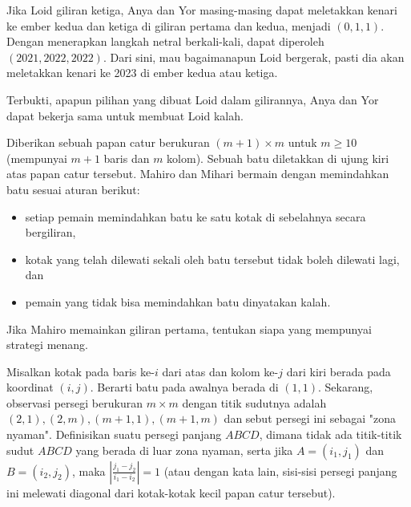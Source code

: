 \documentclass[11pt]{scrartcl}
\begin{document}
\begin{soaljawab}
\begin{solusi}
        Jika Loid giliran ketiga, Anya dan Yor masing-masing dapat meletakkan kenari ke ember kedua dan ketiga di giliran pertama dan kedua, menjadi $(0,1,1)$. Dengan menerapkan langkah netral berkali-kali, dapat diperoleh $(2021,2022,2022)$. Dari sini, mau bagaimanapun Loid bergerak, pasti dia akan meletakkan kenari ke 2023 di ember kedua atau ketiga.

        Terbukti, apapun pilihan yang dibuat Loid dalam gilirannya, Anya dan Yor dapat bekerja sama untuk membuat Loid kalah.
    \end{solusi}
\end{soaljawab}

\begin{soaljawab}
    Diberikan sebuah papan catur berukuran $(m+1) \times m$ untuk $m \ge 10$ (mempunyai $m+1$ baris dan $m$ kolom). Sebuah batu diletakkan di ujung kiri atas papan catur tersebut. Mahiro dan Mihari bermain dengan memindahkan batu sesuai aturan berikut:
    \begin{itemize}
        \item setiap pemain memindahkan batu ke satu kotak di sebelahnya secara bergiliran,
        \item kotak yang telah dilewati sekali oleh batu tersebut tidak boleh dilewati lagi, dan
        \item pemain yang tidak bisa memindahkan batu dinyatakan kalah.
    \end{itemize}
    Jika Mahiro memainkan giliran pertama, tentukan siapa yang mempunyai strategi menang.
    \begin{solusi}
        Misalkan kotak pada baris ke-$i$ dari atas dan kolom ke-$j$ dari kiri berada pada koordinat $(i,j)$. Berarti batu pada awalnya berada di $(1,1)$. Sekarang, observasi persegi berukuran $m \times m$ dengan titik sudutnya adalah  $(2,1), (2,m), (m+1,1), (m+1, m)$ dan sebut persegi ini sebagai "zona nyaman". Definisikan suatu persegi panjang $ABCD$, dimana tidak ada titik-titik sudut $ABCD$ yang berada di luar zona nyaman, serta jika $A=(i_1, j_1)$ dan $B=(i_2,j_2)$, maka $\left|\frac{j_1-j_2}{i_1-i_2}\right| = 1$ (atau dengan kata lain, sisi-sisi persegi panjang ini melewati diagonal dari kotak-kotak kecil papan catur tersebut).


\end{solusi}
\end{soaljawab}
\end{document}
